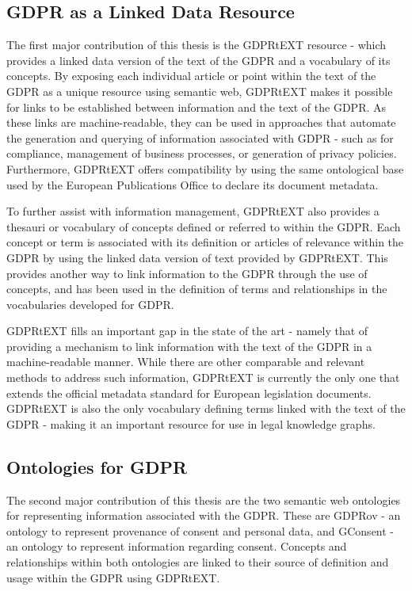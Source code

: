 \subsection{GDPR as a Linked Data Resource}
The first major contribution of this thesis is the GDPRtEXT resource - which provides a linked data version of the text of the GDPR and a vocabulary of its concepts. By exposing each individual article or point within the text of the GDPR as a unique resource using semantic web, GDPRtEXT makes it possible for links to be established between information and the text of the GDPR. As these links are machine-readable, they can be used in approaches that automate the generation and querying of information associated with GDPR - such as for compliance, management of business processes, or generation of privacy policies. Furthermore, GDPRtEXT offers compatibility by using the same ontological base used by the European Publications Office to declare its document metadata.

To further assist with information management, GDPRtEXT also provides a thesauri or vocabulary of concepts defined or referred to within the GDPR. Each concept or term is associated with its definition or articles of relevance within the GDPR by using the linked data version of text provided by GDPRtEXT. This provides another way to link information to the GDPR through the use of concepts, and has been used in the definition of terms and relationships in the vocabularies developed for GDPR.

GDPRtEXT fills an important gap in the state of the art - namely that of providing a mechanism to link information with the text of the GDPR in a machine-readable manner. While there are other comparable and relevant methods to address such information, GDPRtEXT is currently the only one that extends the official metadata standard for European legislation documents. GDPRtEXT is also the only vocabulary defining terms linked with the text of the GDPR - making it an important resource for use in legal knowledge graphs.

\subsection{Ontologies for GDPR}
The second major contribution of this thesis are the two semantic web ontologies for representing information associated with the GDPR. These are GDPRov - an ontology to represent provenance of consent and personal data, and GConsent - an ontology to represent information regarding consent. Concepts and relationships within both ontologies are linked to their source of definition and usage within the GDPR using GDPRtEXT.

